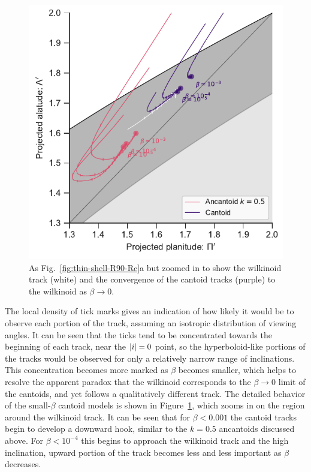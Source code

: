 \begin{figure}
  \centering
  \includegraphics[width=\linewidth]{figs/ancantoid-R90-vs-Rc-lobeta-a}
  \caption{As Fig.~\ref{fig:thin-shell-R90-Rc}a but zoomed in to show
    the wilkinoid track (white) and the convergence of the cantoid
    tracks (purple) to the wilkinoid as \(\beta \to 0\).}
  \label{fig:convergence-cantoid-wilkinoid}
\end{figure}

The local density of tick marks gives an indication of how likely it
would be to observe each portion of the track, assuming an isotropic
distribution of viewing angles.  It can be seen that the ticks tend to
be concentrated towards the beginning of each track, near the
\(\lvert i\rvert = 0\) point, so the hyperboloid-like portions of the tracks
would be observed for only a relatively narrow range of inclinations.
This concentration becomes more marked as \(\beta\) becomes smaller, which
helps to resolve the apparent paradox that the wilkinoid corresponds
to the \(\beta \to 0\) limit of the cantoids, and yet follows a
qualitatively different track.  The detailed behavior of the
small-\(\beta\) cantoid models is shown in
Figure~\ref{fig:convergence-cantoid-wilkinoid}, which zooms in on the
region around the wilkinoid track.  It can be seen that for
\(\beta < 0.001\) the cantoid tracks begin to develop a downward hook,
similar to the \(k = 0.5\) ancantoids discussed above.  For
\(\beta < 10^{-4}\) this begins to approach the wilkinoid track and the
high inclination, upward portion of the track becomes less and less
important as \(\beta\) decreases.






